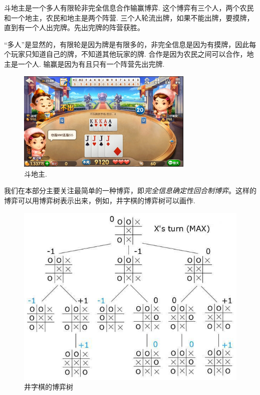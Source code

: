 \begin{example}
    斗地主是一个多人有限轮非完全信息合作输赢博弈. 这个博弈有三个人，两个农民和一个地主，农民和地主是两个阵营. 三个人轮流出牌，如果不能出牌，要摸牌，直到有一个人出完牌。先出完牌的阵营获胜。

    “多人”是显然的，有限轮是因为牌是有限多的，非完全信息是因为有摸牌，因此每个玩家只知道自己的牌，不知道其他玩家的牌. 合作是因为农民之间可以合作，地主是一个人. 输赢是因为有且只有一个阵营先出完牌.
\begin{figure}
    \centering
    \includegraphics[width=0.75\textwidth]{Figures/game/fight-landlord.jpg}
    \caption{斗地主.}
\end{figure}
\end{example}

我们在本部分主要关注最简单的一种博弈，即\emph{完全信息确定性回合制博弈}。这样的博弈可以用博弈树表示出来，例如，井字棋的博弈树可以画作.

\begin{figure}
    \centering
    \includegraphics[scale=0.4]{Figures/game/gametree.jpg}
    \caption{井字棋的博弈树}
    \label{fig:gametree}
\end{figure}

